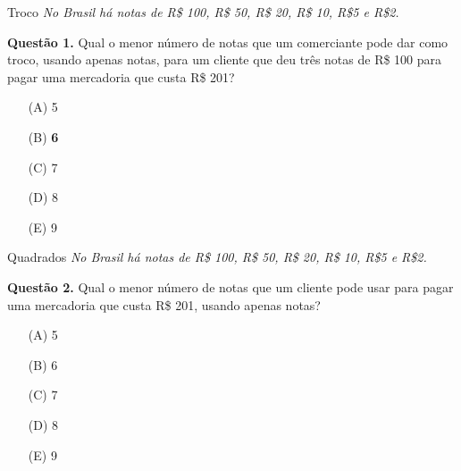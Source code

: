 \documentclass{beamer}
\begin{document}
\begin{frame}{Troco}
\textit{No Brasil há notas de R\$ 100, R\$ 50, R\$ 20, R\$ 10, R\$5 e R\$2.}



\textbf{Questão 1.} Qual o menor número de notas que um comerciante pode dar como troco, usando apenas notas, para um cliente que deu três notas de R\$ 100 para pagar uma mercadoria que custa R\$ 201?
\begin{enumerate}
 \item[(A)] 5
 \item[(B)]\textbf{6}
 \item[(C)] 7
 \item[(D)] 8
 \item[(E)] 9
\end{enumerate}

\end{frame}

\begin{frame}{Quadrados}
\textit{No Brasil há notas de R\$ 100, R\$ 50, R\$ 20, R\$ 10, R\$5 e R\$2.}



\textbf{Questão 2.} Qual o menor número de notas que um cliente pode usar para pagar uma mercadoria que custa R\$ 201, usando apenas notas?
\begin{enumerate}
 \item[(A)] 5
 \item[(B)] 6
 \item[(C)] 7
 \item[(D)] 8
 \item[(E)] 9
\end{enumerate}

\end{frame}

\end{document}
